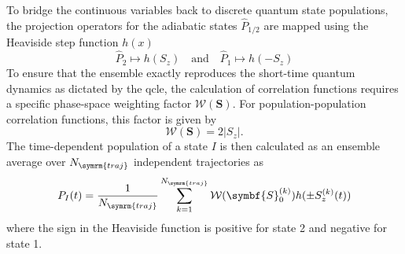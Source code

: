 To bridge the continuous variables back to discrete quantum state populations, the projection operators for the adiabatic states $\hat{P}_{1/2}$ are mapped using the Heaviside step function $h(x)$
\begin{equation}
    \hat{P}_2 \mapsto h(S_z) \quad \text{and} \quad \hat{P}_1 \mapsto h(-S_z)
\end{equation}
To ensure that the ensemble exactly reproduces the short-time quantum dynamics as dictated by the \acrshort{qcle}, the calculation of correlation functions requires a specific phase-space weighting factor $\mathcal{W}(\symbf{S})$. For population-population correlation functions, this factor is given by
\begin{equation}
\mathcal{W}(\symbf{S})=2\lvert S_z\rvert.
\end{equation}
The time-dependent population of a state $I$ is then calculated as an ensemble average over $N_{\symrm{traj}}$ independent trajectories as
\begin{equation}
P_I(t)=\frac{1}{N_{\symrm{traj}}}\sum_{k=1}^{N_{\symrm{traj}}} \mathcal{W}(\symbf{S}_0^{(k)}) h(\pm S_z^{(k)}(t))
\end{equation}
where the sign in the Heaviside function is positive for state 2 and negative for state 1.
